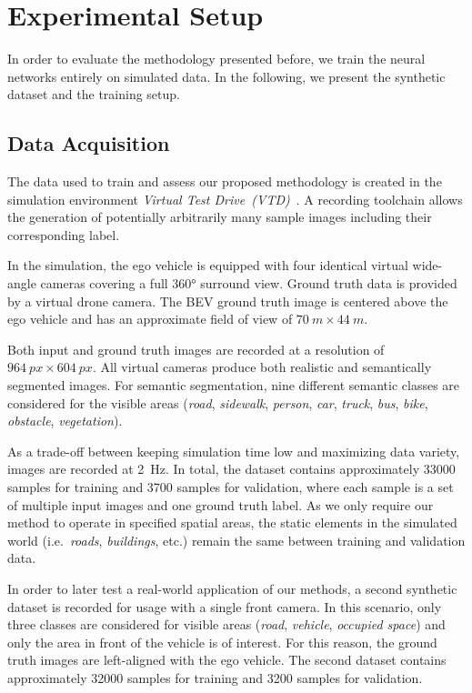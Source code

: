 \documentclass[a4paper, 10pt, conference]{ieeeconf}
\begin{document}
\section{Experimental Setup}

In order to evaluate the methodology presented before, we train the neural networks entirely on simulated data. In the following, we present the synthetic dataset and the training setup.

\subsection{Data Acquisition}

The data used to train and assess our proposed methodology is created in the simulation environment \textit{Virtual Test Drive~(VTD)}~\cite{Neumann-CoselEtAl_VirtualTestDrive_2009}. A recording toolchain allows the generation of potentially arbitrarily many sample images including their corresponding label.

In the simulation, the ego vehicle is equipped with four identical virtual wide-angle cameras covering a full \ang{360} surround view. Ground truth data is provided by a virtual drone camera. The BEV ground truth image is centered above the ego vehicle and has an approximate field of view of \( \SI{70}{m} \times \SI{44}{m} \). 

Both input and ground truth images are recorded at a resolution of \( \SI{964}{px} \times \SI{604}{px} \). All virtual cameras produce both realistic and semantically segmented images. For semantic segmentation, nine different semantic classes are considered for the visible areas (\textit{road}, \textit{sidewalk}, \textit{person}, \textit{car}, \textit{truck}, \textit{bus}, \textit{bike}, \textit{obstacle}, \textit{vegetation}).

As a trade-off between keeping simulation time low and maximizing data variety, images are recorded at \SI{2}{Hz}. In total, the dataset contains approximately \num{33000} samples for training and \num{3700} samples for validation, where each sample is a set of multiple input images and one ground truth label. As we only require our method to operate in specified spatial areas, the static elements in the simulated world (i.e.\ \textit{roads}, \textit{buildings}, etc.) remain the same between training and validation data.

In order to later test a real-world application of our methods, a second synthetic dataset is recorded for usage with a single front camera. In this scenario, only three classes are considered for visible areas (\textit{road}, \textit{vehicle}, \textit{occupied space}) and only the area in front of the vehicle is of interest. For this reason, the ground truth images are left-aligned with the ego vehicle. The second dataset contains approximately \num{32000} samples for training and \num{3200} samples for validation.
\end{document}
